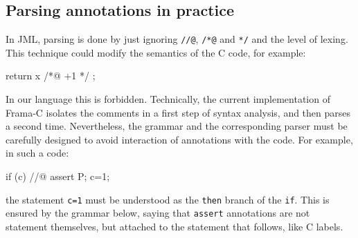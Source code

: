 \subsection{Parsing annotations in practice}

In JML, parsing is done by just ignoring \verb|//@|, \verb|/*@| and
\verb|*/| and the level of lexing. This technique could modify the
semantics of the C code, for example: 
\begin{c}
return x /*@ +1 */ ;
\end{c}
In our language this is forbidden. Technically, the current
implementation of Frama-C isolates the comments in a first step of
syntax analysis, and then parses a second time. Nevertheless, the
grammar and the corresponding parser must be carefully designed to
avoid interaction of annotations with the code. For example, in such a
code: 
\begin{c}
  if (c) //@ assert P;
     c=1;
\end{c}
the statement \verb|c=1| must be understood as the \texttt{then}
branch of the \texttt{if}. This is ensured by the grammar below,
saying that \verb|assert| annotations are not statement themselves,
but attached to the statement that follows, like C labels.
